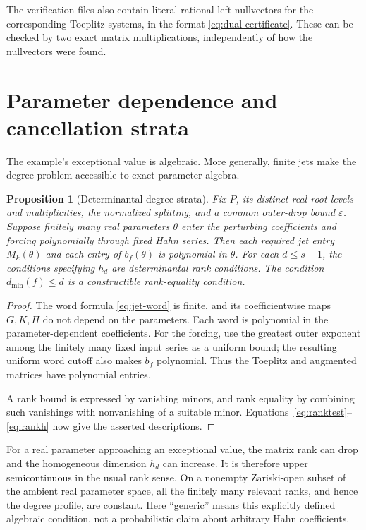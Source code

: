 \documentclass[11pt,a4paper]{article}
\numberwithin{equation}{section}
\newtheorem{proposition}[theorem]{Proposition}
\theoremstyle{definition}
\theoremstyle{remark}
\theoremstyle{definition}
\newcommand{\eps}{\varepsilon}
\begin{document}
The verification files also contain literal rational left-nullvectors for the corresponding Toeplitz systems, in the format \eqref{eq:dual-certificate}. These can be checked by two exact matrix multiplications, independently of how the nullvectors were found.

\section{Parameter dependence and cancellation strata}
\label{sec:parameters}
The example's exceptional value is algebraic. More generally, finite jets make the degree problem accessible to exact parameter algebra.

\begin{proposition}[Determinantal degree strata]
\label{prop:strata}
Fix $P$, its distinct real root levels and multiplicities, the normalized splitting, and a common outer-drop bound $\eps$. Suppose finitely many real parameters $\theta$ enter the perturbing coefficients and forcing polynomially through fixed Hahn series. Then each required jet entry $M_k(\theta)$ and each entry of $b_f(\theta)$ is polynomial in $\theta$. For each $d\le s-1$, the conditions specifying $h_d$ are determinantal rank conditions. The condition $d_{\min}(f)\le d$ is a constructible rank-equality condition.
\end{proposition}
\begin{proof}
The word formula \eqref{eq:jet-word} is finite, and its coefficientwise maps $G,K,\Pi$ do not depend on the parameters. Each word is polynomial in the parameter-dependent coefficients. For the forcing, use the greatest outer exponent among the finitely many fixed input series as a uniform bound; the resulting uniform word cutoff also makes $b_f$ polynomial. Thus the Toeplitz and augmented matrices have polynomial entries.

A rank bound is expressed by vanishing minors, and rank equality by combining such vanishings with nonvanishing of a suitable minor. Equations~\eqref{eq:ranktest}--\eqref{eq:rankh} now give the asserted descriptions.
\end{proof}

For a real parameter approaching an exceptional value, the matrix rank can drop and the homogeneous dimension $h_d$ can increase. It is therefore upper semicontinuous in the usual rank sense. On a nonempty Zariski-open subset of the ambient real parameter space, all the finitely many relevant ranks, and hence the degree profile, are constant. Here ``generic'' means this explicitly defined algebraic condition, not a probabilistic claim about arbitrary Hahn coefficients.
\end{document}
